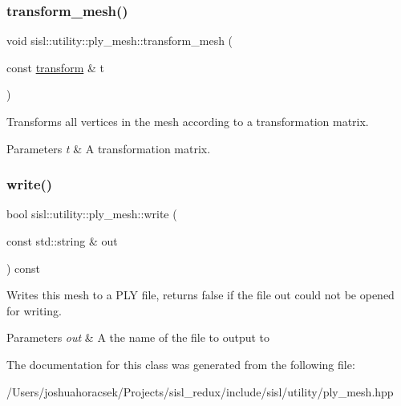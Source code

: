 \subsubsection{\texorpdfstring{transform\+\_\+mesh()}{transform\_mesh()}}
{\footnotesize\ttfamily void sisl\+::utility\+::ply\+\_\+mesh\+::transform\+\_\+mesh (\begin{DoxyParamCaption}\item[{const \hyperlink{namespacesisl_a2ef12d285ca3e626c05abbdec1f8a679}{transform} \&}]{t }\end{DoxyParamCaption})\hspace{0.3cm}{\ttfamily [inline]}}

Transforms all vertices in the mesh according to a transformation matrix. 
\begin{DoxyParams}{Parameters}
{\em t} & A transformation matrix. \\
\hline
\end{DoxyParams}
\mbox{\label{classsisl_1_1utility_1_1ply__mesh_a4fce9e2a1f3d81b2243465d305164205}} 
\subsubsection{\texorpdfstring{write()}{write()}}
{\footnotesize\ttfamily bool sisl\+::utility\+::ply\+\_\+mesh\+::write (\begin{DoxyParamCaption}\item[{const std\+::string \&}]{out }\end{DoxyParamCaption}) const\hspace{0.3cm}{\ttfamily [inline]}}

Writes this mesh to a P\+LY file, returns false if the file \textquotesingle{}out\textquotesingle{} could not be opened for writing. 
\begin{DoxyParams}{Parameters}
{\em out} & A the name of the file to output to \\
\hline
\end{DoxyParams}


The documentation for this class was generated from the following file\+:\begin{DoxyCompactItemize}
\item 
/\+Users/joshuahoracsek/\+Projects/sisl\+\_\+redux/include/sisl/utility/ply\+\_\+mesh.\+hpp\end{DoxyCompactItemize}
